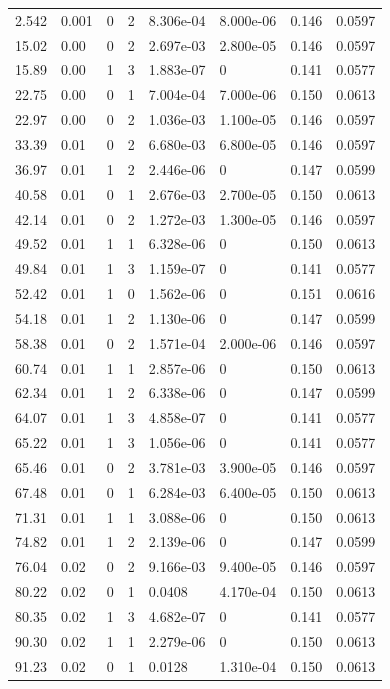 \documentclass[preview]{standalone}
\begin{document}
{{\begin{tabular}{L{1.2cm}C{1.2cm} C{0.3cm}C{0.5cm} C{1.4cm}C{1.4cm} C{1.4cm}C{1.4cm}}
  2.542  &  0.001  & 0     &  2 &  8.306e-04  & 8.000e-06  & 0.146 &  0.0597   \\ 
  15.02  &  0.00  & 0     &  2 &  2.697e-03  & 2.800e-05  & 0.146 &  0.0597   \\ 
  15.89  &  0.00  & 1     &  3 &  1.883e-07  & 0  & 0.141 &  0.0577   \\ 
  22.75  &  0.00  & 0     &  1 &  7.004e-04  & 7.000e-06  & 0.150 &  0.0613   \\ 
  22.97  &  0.00  & 0     &  2 &  1.036e-03  & 1.100e-05  & 0.146 &  0.0597   \\ 
  33.39  &  0.01  & 0     &  2 &  6.680e-03  & 6.800e-05  & 0.146 &  0.0597   \\ 
  36.97  &  0.01  & 1     &  2 &  2.446e-06  & 0  & 0.147 &  0.0599   \\ 
  40.58  &  0.01  & 0     &  1 &  2.676e-03  & 2.700e-05  & 0.150 &  0.0613   \\ 
  42.14  &  0.01  & 0     &  2 &  1.272e-03  & 1.300e-05  & 0.146 &  0.0597   \\ 
  49.52  &  0.01  & 1     &  1 &  6.328e-06  & 0  & 0.150 &  0.0613   \\ 
  49.84  &  0.01  & 1     &  3 &  1.159e-07  & 0  & 0.141 &  0.0577   \\ 
  52.42  &  0.01  & 1     &  0 &  1.562e-06  & 0  & 0.151 &  0.0616   \\ 
  54.18  &  0.01  & 1     &  2 &  1.130e-06  & 0  & 0.147 &  0.0599   \\ 
  58.38  &  0.01  & 0     &  2 &  1.571e-04  & 2.000e-06  & 0.146 &  0.0597   \\ 
  60.74  &  0.01  & 1     &  1 &  2.857e-06  & 0  & 0.150 &  0.0613   \\ 
  62.34  &  0.01  & 1     &  2 &  6.338e-06  & 0  & 0.147 &  0.0599   \\ 
  64.07  &  0.01  & 1     &  3 &  4.858e-07  & 0  & 0.141 &  0.0577   \\ 
  65.22  &  0.01  & 1     &  3 &  1.056e-06  & 0  & 0.141 &  0.0577   \\ 
  65.46  &  0.01  & 0     &  2 &  3.781e-03  & 3.900e-05  & 0.146 &  0.0597   \\ 
  67.48  &  0.01  & 0     &  1 &  6.284e-03  & 6.400e-05  & 0.150 &  0.0613   \\ 
  71.31  &  0.01  & 1     &  1 &  3.088e-06  & 0  & 0.150 &  0.0613   \\ 
  74.82  &  0.01  & 1     &  2 &  2.139e-06  & 0  & 0.147 &  0.0599   \\ 
  76.04  &  0.02  & 0     &  2 &  9.166e-03  & 9.400e-05  & 0.146 &  0.0597   \\ 
  80.22  &  0.02  & 0     &  1 &  0.0408  & 4.170e-04  & 0.150 &  0.0613   \\ 
  80.35  &  0.02  & 1     &  3 &  4.682e-07  & 0  & 0.141 &  0.0577   \\ 
  90.30  &  0.02  & 1     &  1 &  2.279e-06  & 0  & 0.150 &  0.0613   \\ 
  91.23  &  0.02  & 0     &  1 &  0.0128  & 1.310e-04  & 0.150 &  0.0613   \\ 
\hline 
\end{tabular} 

}}
\end{document}
